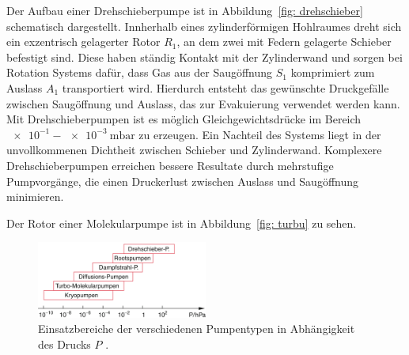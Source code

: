 Der Aufbau einer Drehschieberpumpe ist in Abbildung~\ref{fig: drehschieber} schematisch dargestellt. Innherhalb
eines zylinderförmigen Hohlraumes dreht sich ein exzentrisch gelagerter Rotor $R_1$, an dem zwei mit Federn gelagerte
Schieber befestigt sind. Diese haben ständig Kontakt mit der Zylinderwand und sorgen bei Rotation Systems dafür, dass
Gas aus der Saugöffnung $S_1$ komprimiert zum Auslass $A_1$ transportiert wird. Hierdurch entsteht das gewünschte
Druckgefälle zwischen Saugöffnung und Auslass, das zur Evakuierung verwendet werden kann. Mit Drehschieberpumpen
ist es möglich Gleichgewichtsdrücke im Bereich $\num{e-1} - \SI{e-3}{\milli\bar}$ zu erzeugen. Ein Nachteil des
Systems liegt in der unvollkommenen Dichtheit zwischen Schieber und Zylinderwand. Komplexere Drehschieberpumpen
erreichen bessere Resultate durch mehrstufige Pumpvorgänge, die einen Druckerlust
zwischen Auslass und Saugöffnung minimieren.

Der Rotor einer Molekularpumpe ist in Abbildung~\ref{fig: turbu} zu sehen.  


\begin{figure}
  \centering
  \includegraphics[width = 0.5\textwidth]{theorie_plots/einsatzbereich_pumpen.png}
  \caption{Einsatzbereiche der verschiedenen Pumpentypen in Abhängigkeit des Drucks $P$ \cite{dem1}.}
  \label{fig: einordnung_pumpen}
\end{figure}

